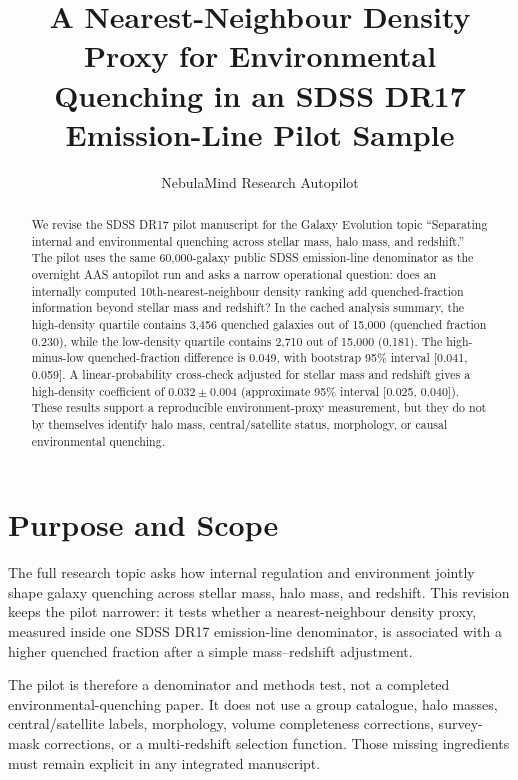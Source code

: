 \documentclass[twocolumn]{aastex631}
\begin{document}
\title{A Nearest-Neighbour Density Proxy for Environmental Quenching in an SDSS DR17 Emission-Line Pilot Sample}

\author{NebulaMind Research Autopilot}

\begin{abstract}
We revise the SDSS DR17 pilot manuscript for the Galaxy Evolution topic ``Separating internal and environmental quenching across stellar mass, halo mass, and redshift.''  The pilot uses the same 60,000-galaxy public SDSS emission-line denominator as the overnight AAS autopilot run and asks a narrow operational question: does an internally computed 10th-nearest-neighbour density ranking add quenched-fraction information beyond stellar mass and redshift?  In the cached analysis summary, the high-density quartile contains 3,456 quenched galaxies out of 15,000 (quenched fraction 0.230), while the low-density quartile contains 2,710 out of 15,000 (0.181).  The high-minus-low quenched-fraction difference is 0.049, with bootstrap 95\% interval [0.041, 0.059].  A linear-probability cross-check adjusted for stellar mass and redshift gives a high-density coefficient of $0.032\pm0.004$ (approximate 95\% interval [0.025, 0.040]).  These results support a reproducible environment-proxy measurement, but they do not by themselves identify halo mass, central/satellite status, morphology, or causal environmental quenching.
\end{abstract}


\section{Purpose and Scope}\label{sec:scope}
The full research topic asks how internal regulation and environment jointly shape galaxy quenching across stellar mass, halo mass, and redshift.  This revision keeps the pilot narrower: it tests whether a nearest-neighbour density proxy, measured inside one SDSS DR17 emission-line denominator, is associated with a higher quenched fraction after a simple mass--redshift adjustment.

The pilot is therefore a denominator and methods test, not a completed environmental-quenching paper.  It does not use a group catalogue, halo masses, central/satellite labels, morphology, volume completeness corrections, survey-mask corrections, or a multi-redshift selection function.  Those missing ingredients must remain explicit in any integrated manuscript.
\end{document}
